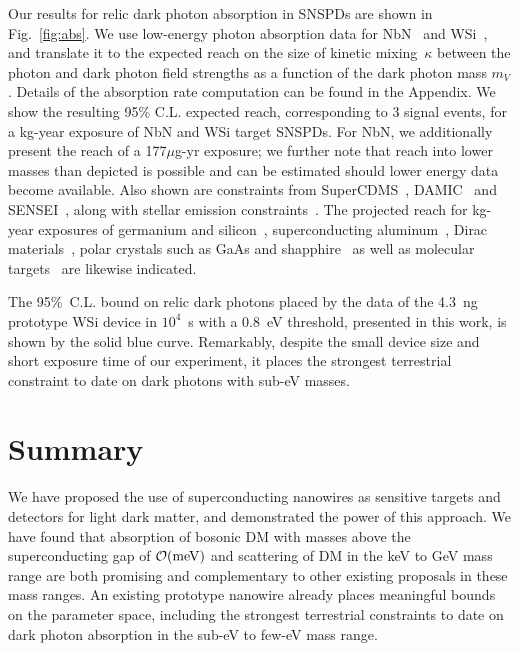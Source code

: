 \documentclass[twocolumn,10pt,prl,nofootinbib,preprintnumbers]{revtex4-1}
\begin{document}
Our results for relic dark photon absorption in SNSPDs are shown in
Fig.~\ref{fig:abs}. We use low-energy photon absorption data for
NbN~\cite{Marsili2012} and WSi~\cite{Marsili2013, Yamada2008}, and
translate it to the expected reach on the size of kinetic mixing~$\kappa$ between the photon and dark photon field strengths as a function of the dark photon mass $m_V$. Details of
the absorption rate computation can be found in the Appendix. We show the
resulting 95\% C.L. expected reach, corresponding to 3 signal events,
for a kg-year exposure of NbN and WSi target SNSPDs. For NbN, we additionally present the reach of a 177$\mu$g-yr exposure; we further note that reach into lower masses than depicted is possible
and can be estimated should lower energy data become
available. Also shown are constraints from SuperCDMS~\cite{Agnese:2018col}, 
DAMIC~\cite{Aguilar-Arevalo:2016zop} and SENSEI~\cite{Abramoff:2019dfb}, along with stellar emission
constraints~\cite{An:2013yua,An:2014twa}. The projected reach for kg-year exposures of germanium
and silicon~\cite{Hochberg:2016sqx}, superconducting
aluminum~\cite{Hochberg:2016ajh}, Dirac
materials~\cite{Hochberg:2017wce}, polar crystals such as GaAs and
shapphire~\cite{Griffin:2018bjn} as well as molecular
targets~\cite{Arvanitaki:2017nhi} are likewise indicated.

The 95\%~C.L. bound on relic dark photons placed by the data of the 4.3~ng prototype WSi
device in $10^4$~s with a 0.8~eV threshold, 
presented in this work, 
is shown by the
solid blue curve. 
 Remarkably, despite the small device size and short exposure time of our experiment, it places the strongest  terrestrial constraint to date on dark photons with sub-eV masses. 

\section{Summary}

We have proposed the use of superconducting nanowires as sensitive
targets and detectors for light dark matter, and demonstrated the
power of this approach. 
We have found that absorption of bosonic DM with masses above
the superconducting gap of ${\cal O}({\rm  meV})$ and scattering of DM in the keV to GeV mass range are both
promising and complementary to other existing proposals in these mass
ranges. An existing prototype nanowire already places meaningful
bounds on the parameter space, including the strongest terrestrial
constraints to date on dark photon absorption in the sub-eV to few-eV
mass range.
\end{document}
